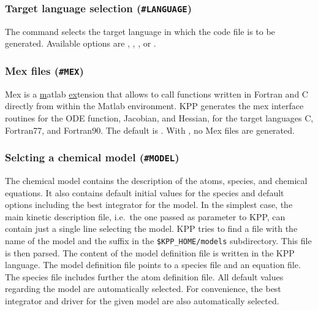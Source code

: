 \documentclass[twoside]{article}
\begin{document}
\subsubsection{Target language selection ({\tt\#LANGUAGE})}
\label{sec:command-language}

The  command selects the target language in which the
code file is to be generated. Available options are ,
, , or .

\subsubsection{Mex files ({\tt\#MEX})}
\label{sec:command-mex}

Mex is a \underline{m}atlab \underline{ex}tension that allows to call
functions written in Fortran and C directly from within the Matlab
environment. KPP generates the mex interface routines for the ODE
function, Jacobian, and Hessian, for the target languages C, Fortran77,
and Fortran90.  The default is . With , no Mex files
are generated.

\subsubsection{Selcting a chemical model ({\tt\#MODEL})}
\label{sec:command-model}

The chemical model contains the description of the atoms, species, and
chemical equations. It also contains default initial values for the
species and default options including the best integrator for the model.
In the simplest case, the main kinetic description file, i.e.\ the one
passed as parameter to KPP, can contain just a single line selecting the
model. KPP tries to find a file with the name of the model and the
suffix  in the \verb|$KPP_HOME/models| subdirectory. This
file is then parsed. The content of the model definition file is written
in the KPP language. The model definition file points to a species file
and an equation file. The species file includes further the atom
definition file. All default values regarding the model are
automatically selected. For convenience, the best integrator and driver
for the given model are also automatically selected. %
\end{document}
